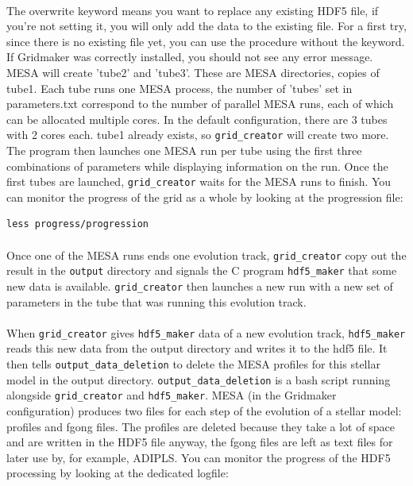 \documentclass{report}
\begin{document}
\paragraph{} The overwrite keyword means you want to replace any existing HDF5 file, if you're not setting it, you will only add the data to the existing file. For a first try, since there is no existing file yet, you can use the procedure without the keyword. If Gridmaker was correctly installed, you should not see any error message. MESA will create 'tube2' and 'tube3'. These are MESA directories, copies of tube1. Each tube runs one MESA process, the number of 'tubes' set in parameters.txt correspond to the number of parallel MESA runs, each of which can be allocated multiple cores. In the default configuration, there are 3 tubes with 2 cores each. tube1 already exists, so \verb+grid_creator+ will create two more. The program then launches one MESA run per tube using the first three combinations of parameters while displaying information on the run. Once the first tubes are launched, \verb+grid_creator+ waits for the MESA runs to finish. You can monitor the progress of the grid as a whole by looking at the progression file:\\ 
\begin{verbatim}
less progress/progression
\end{verbatim}
\paragraph{} Once one of the MESA runs ends one evolution track, \verb+grid_creator+ copy out the result in the \verb+output+ directory and signals the C program \verb+hdf5_maker+ that some new data is available. \verb+grid_creator+ then launches a new run with a new set of parameters in the tube that was running this evolution track.

\paragraph{} When \verb+grid_creator+ gives \verb+hdf5_maker+ data of a new evolution track, \verb+hdf5_maker+ reads this new data from the output directory and writes it to the hdf5 file. It then tells \verb+output_data_deletion+ to delete the MESA profiles for this stellar model in the output directory. \verb+output_data_deletion+ is a bash script running alongside \verb+grid_creator+ and \verb+hdf5_maker+. MESA (in the Gridmaker configuration) produces two files for each step of the evolution of a stellar model: profiles and fgong files. The profiles  are deleted because they take a lot of space and are written in the HDF5 file anyway, the fgong files are left as text files for later use by, for example, ADIPLS. You can monitor the progress of the HDF5 processing by looking at the dedicated logfile: 
\end{document}
